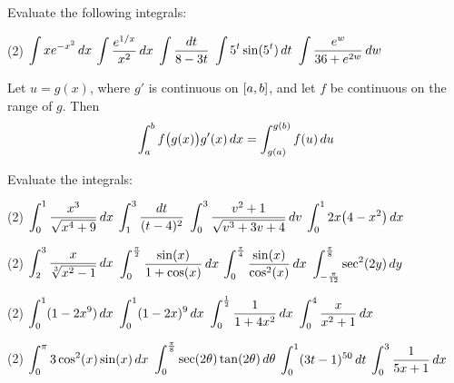 \documentclass[mathNotesPreamble]{subfiles}
\begin{document}
  \begin{ex*}
    Evaluate the following integrals:
  \end{ex*}
  \begin{tasks}[after-item-skip=\stretch{1}](2)
    \task $\ds\int xe\inv[x^2]\,dx$
    \task $\ds\int \frac{e^{1/x}}{x^2}\,dx$
    \task $\ds\int \frac{dt}{8-3t}$
    \task $\ds\int 5^t\sin(5^t)\,dt$
    \task $\ds\int \frac{e^w}{36+e^{2w}}\,dw$
  \end{tasks}
  \pagebreak

  \begin{thmBox*}
    Let $u=g(x)$, where $g'$ is continuous on $\sbrkt{a,b}$, and let $f$ be continuous on the range of $g$. Then
      \[\int_a^b f\parens{g(x)\vphantom{g(x)^1}}g'(x)\,dx=\int_{g(a)}^{g(b)}f(u)\,du\]
  \end{thmBox*}

  \begin{ex*}
    Evaluate the integrals:
  \end{ex*}
  \begin{tasks}[after-item-skip=\stretch{1}](2)
    \task $\ds\int_0^1 \frac{x^3}{\sqrt{x^4+9}}\,dx$
    \task $\ds\int_1^3 \frac{dt}{(t-4)^2}$
    \task $\ds\int_0^3 \frac{v^2+1}{\sqrt{v^3+3v+4}}\,dv$
    \task $\ds\int_0^1 2x\parens{4-x^2}\,dx$
  \end{tasks}
  \pagebreak
  
  \begin{tasks}[after-item-skip=\stretch{1}, resume](2)
    \task $\ds\int_2^3 \frac{x}{\sqrt[3]{x^2-1}}\,dx$
    \task $\ds\int_{0}^{\frac{\pi}{2}} \frac{\sin(x)}{1+\cos(x)}\,dx$
    \task $\ds\int_0^{\frac{\pi}{4}} \frac{\sin(x)}{\cos^2(x)}\,dx$
    \task $\ds\int_{-\frac{\pi}{12}}^{\frac{\pi}{8}} \sec^2(2y)\,dy$
  \end{tasks}
  \pagebreak
  
  \begin{tasks}[after-item-skip=\stretch{1}, resume](2)
    \task $\ds\int_0^1 (1-2x^9)\,dx$
    \task $\ds\int_0^1 (1-2x)^9\,dx$
    \task $\ds\int_0^{\frac{1}{2}} \frac{1}{1+4x^2}\,dx$
    \task $\ds\int_0^4 \frac{x}{x^2+1}\,dx$
  \end{tasks}
  \pagebreak
  
  \begin{tasks}[after-item-skip=\stretch{1}, resume](2)
    \task $\ds\int_0^\pi 3\cos^2(x)\sin(x)\,dx$
    \task $\ds\int_0^{\frac{\pi}{8}} \sec(2\theta)\tan(2\theta)\,d\theta$
    \task $\ds\int_0^1 (3t-1)^{50}\,dt$
    \task $\ds\int_0^3 \frac{1}{5x+1}\,dx$
  \end{tasks}
  \pagebreak
  
\end{document}
